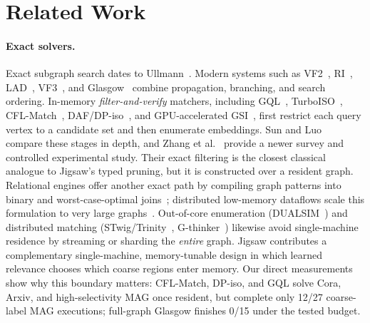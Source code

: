 \documentclass[runningheads]{llncs}
\begin{document}
\section{Related Work}

\paragraph{Exact solvers.}
Exact subgraph search dates to Ullmann~\cite{ref_ullmann}. Modern systems such as VF2~\cite{ref_vf2}, RI~\cite{ref_ri}, LAD~\cite{ref_lad}, VF3~\cite{ref_vf3}, and Glasgow~\cite{ref_glasgow} combine propagation, branching, and search ordering. In-memory \emph{filter-and-verify} matchers, including GQL~\cite{ref_graphql}, TurboISO~\cite{ref_turboiso}, CFL-Match~\cite{ref_cflmatch}, DAF/DP-iso~\cite{ref_daf}, and GPU-accelerated GSI~\cite{ref_gsi}, first restrict each query vertex to a candidate set and then enumerate embeddings. Sun and Luo~\cite{ref_survey} compare these stages in depth, and Zhang et al.~\cite{ref_survey2024} provide a newer survey and controlled experimental study. Their exact filtering is the closest classical analogue to Jigsaw's typed pruning, but it is constructed over a resident graph. Relational engines offer another exact path by compiling graph patterns into binary and worst-case-optimal joins~\cite{ref_wcoj}; distributed low-memory dataflows scale this formulation to very large graphs~\cite{ref_lowmem}. Out-of-core enumeration (DUALSIM~\cite{ref_dualsim}) and distributed matching (STwig/Trinity~\cite{ref_trinity}, G-thinker~\cite{ref_gthinker}) likewise avoid single-machine residence by streaming or sharding the \emph{entire} graph. Jigsaw contributes a complementary single-machine, memory-tunable design in which learned relevance chooses which coarse regions enter memory. Our direct measurements show why this boundary matters: CFL-Match, DP-iso, and GQL solve Cora, Arxiv, and high-selectivity MAG once resident, but complete only 12/27 coarse-label MAG executions; full-graph Glasgow finishes 0/15 under the tested budget.
\end{document}
